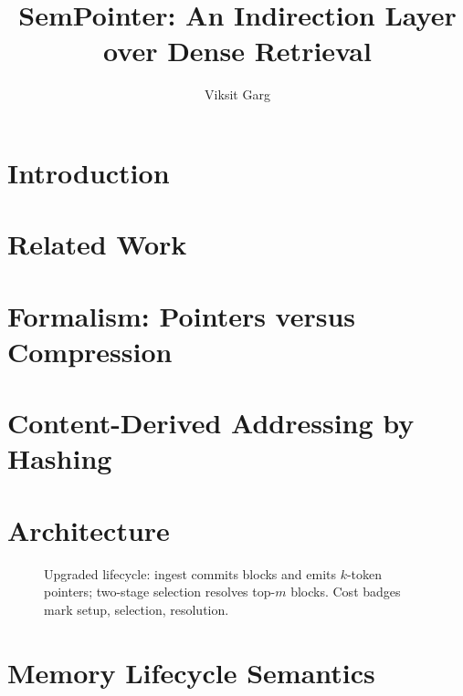 \documentclass[runningheads]{llncs}
\begin{document}
\title{SemPointer: An Indirection Layer over Dense Retrieval}
\author{Viksit Garg}
\maketitle



\section{Introduction}
\label{sec:c-intro}


\section{Related Work}
\label{sec:c-related}


\section{Formalism: Pointers versus Compression}
\label{sec:c-formal}


\section{Content-Derived Addressing by Hashing}
\label{sec:c-hash}


\section{Architecture}
\label{sec:c-arch}


\begin{figure}[t]
\centering
\resizebox{0.8\columnwidth}{!}{}
\caption{Upgraded lifecycle: ingest commits blocks and emits $k$-token pointers; two-stage selection resolves top-$m$ blocks. Cost badges mark setup, selection, resolution.}
\label{fig:C1-arch}
\end{figure}

\section{Memory Lifecycle Semantics}
\label{sec:c-life}

\end{document}
